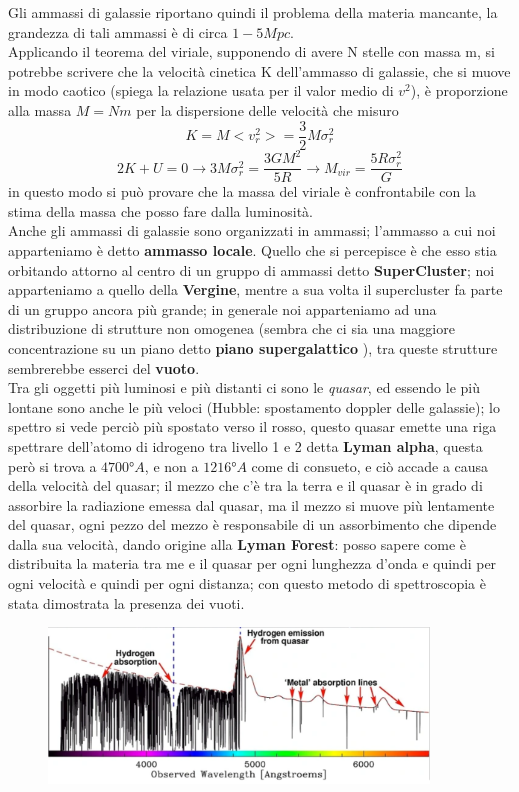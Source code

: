\documentclass[a4paper,11pt]{article}
\begin{document}
 Gli ammassi di galassie riportano quindi il problema della materia mancante, la grandezza di tali ammassi è di circa $1-5 Mpc$.\\
 Applicando il teorema del viriale, supponendo di avere N 
 stelle con massa m, si potrebbe scrivere che la velocità cinetica K dell'ammasso di galassie, che si muove in modo caotico (spiega la relazione usata per il valor medio di  $v^2$), è proporzione alla massa $M=Nm$ per la dispersione delle velocità che misuro $$K=M<v_r^2>=\frac{3}{2}M\sigma_r^2$$
 $$2K+U=0\rightarrow 3M\sigma_r^2=\frac{3GM^2}{5R}\rightarrow M_{vir}=\frac{5R\sigma_r^2}{G}$$
 in questo modo si può provare che la massa del viriale è confrontabile con la stima della massa che posso fare dalla luminosità.\\
 Anche gli ammassi di galassie sono organizzati in ammassi; l'ammasso a cui noi apparteniamo è detto \textbf{ammasso locale}. Quello che si percepisce è che esso stia orbitando attorno al centro di un gruppo di ammassi detto \textbf{SuperCluster}; noi apparteniamo a quello della \textbf{Vergine}, mentre a sua volta il supercluster fa parte di un gruppo ancora più grande; in generale noi apparteniamo ad una distribuzione di strutture non omogenea (sembra che ci sia una maggiore concentrazione su un piano detto \textbf{piano supergalattico} ), tra queste strutture sembrerebbe esserci del \textbf{vuoto}.\\
 Tra gli oggetti più luminosi e più distanti ci sono le \textit{quasar}, ed essendo le più lontane sono anche le più veloci (Hubble: spostamento doppler delle galassie); lo spettro si vede  perciò  più spostato verso il rosso, questo quasar emette una riga spettrare dell'atomo di idrogeno tra livello 1 e 2 detta \textbf{Lyman alpha}, questa però si trova a $4700°A$, e non a $1216°A$ come di consueto, e ciò accade a causa della velocità del quasar; il mezzo che c'è tra la terra e il quasar è in grado di assorbire la radiazione emessa dal quasar, ma il mezzo si muove più lentamente del quasar,  ogni pezzo del mezzo è responsabile di un assorbimento che dipende dalla sua velocità, dando origine alla \textbf{Lyman Forest}: posso sapere come è distribuita la materia tra me e il quasar per ogni lunghezza d'onda e quindi per ogni velocità e quindi per ogni distanza; con questo metodo di spettroscopia è stata dimostrata la presenza dei vuoti.\\
  \begin{figure} [h]
        \centering
        \includegraphics[width=0.9\textwidth]{immagini_lezioni12-12/44.png}
        \label{}
    \end{figure}
\end{document}
